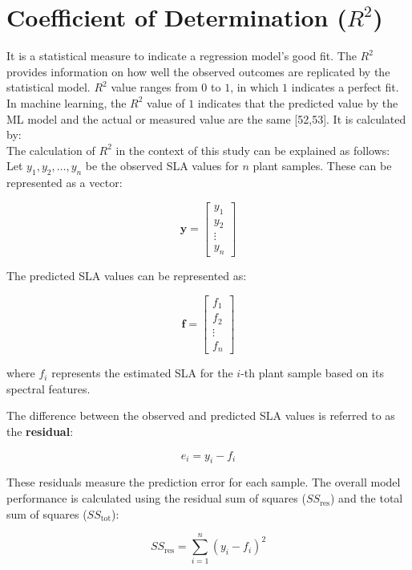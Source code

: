 \documentclass[12pt,a4paper]{report}
\begin{document}
\section{Coefficient of Determination ($R^2$)}
It is a statistical measure to indicate a regression model's good fit. The $R^2$ provides information on how well the observed outcomes are replicated by the statistical model. $R^2$ value ranges from $0$ to $1$, in which $1$ indicates a perfect fit. In machine learning, the $R^2$ value of $1$ indicates that the predicted value by the ML model and the actual or measured value are the same [52,53]. It is calculated by: \\

The calculation of $R^2$ in the context of this study can be explained as follows: \\

Let \( y_1, y_2, \dots, y_n \) be the observed SLA values for \( n \) plant samples. These can be represented as a vector:

\[
\mathbf{y} = \begin{bmatrix} y_1 \\ y_2 \\ \vdots \\ y_n \end{bmatrix}
\]

The predicted SLA values can be represented as:

\[
\mathbf{f} = \begin{bmatrix} f_1 \\ f_2 \\ \vdots \\ f_n \end{bmatrix}
\]

where \( f_i \) represents the estimated SLA for the \( i \)-th plant sample based on its spectral features.


The difference between the observed and predicted SLA values is referred to as the \textbf{residual}:

\begin{equation}
   e_i = y_i - f_i 
\end{equation}



These residuals measure the prediction error for each sample. The overall model performance is calculated using the residual sum of squares (\( SS_{\text{res}} \)) and the total sum of squares (\( SS_{\text{tot}} \)):

\begin{equation}
   SS_{\text{res}} = \sum_{i=1}^{n} (y_i - f_i)^2 
\end{equation}
\end{document}
